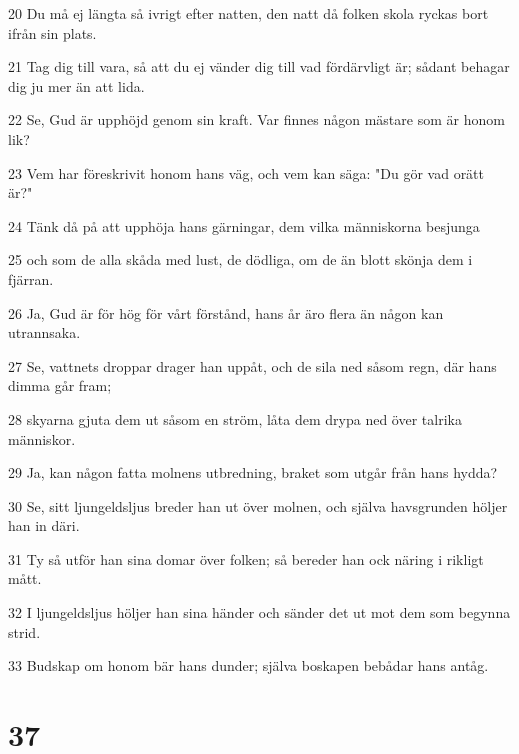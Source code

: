 \par 20 Du må ej längta så ivrigt efter natten, den natt då folken skola ryckas bort ifrån sin plats.
\par 21 Tag dig till vara, så att du ej vänder dig till vad fördärvligt är; sådant behagar dig ju mer än att lida.
\par 22 Se, Gud är upphöjd genom sin kraft. Var finnes någon mästare som är honom lik?
\par 23 Vem har föreskrivit honom hans väg, och vem kan säga: "Du gör vad orätt är?"
\par 24 Tänk då på att upphöja hans gärningar, dem vilka människorna besjunga
\par 25 och som de alla skåda med lust, de dödliga, om de än blott skönja dem i fjärran.
\par 26 Ja, Gud är för hög för vårt förstånd, hans år äro flera än någon kan utrannsaka.
\par 27 Se, vattnets droppar drager han uppåt, och de sila ned såsom regn, där hans dimma går fram;
\par 28 skyarna gjuta dem ut såsom en ström, låta dem drypa ned över talrika människor.
\par 29 Ja, kan någon fatta molnens utbredning, braket som utgår från hans hydda?
\par 30 Se, sitt ljungeldsljus breder han ut över molnen, och själva havsgrunden höljer han in däri.
\par 31 Ty så utför han sina domar över folken; så bereder han ock näring i rikligt mått.
\par 32 I ljungeldsljus höljer han sina händer och sänder det ut mot dem som begynna strid.
\par 33 Budskap om honom bär hans dunder; själva boskapen bebådar hans antåg.

\chapter{37}

